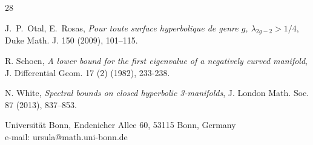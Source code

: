 \documentclass[11pt]{amsart}
\theoremstyle{plain}
\theoremstyle{plain}
\theoremstyle{definition}
\begin{document}
\begin{thebibliography}{28}







 J.~P.~Otal, E.~Rosas,
{\em Pour toute surface hyperbolique de genre $g$, 
$\lambda_{2g-2}>1/4$}, Duke Math. J. 150 (2009), 101--115. 





 R. Schoen,  {\em A lower bound for the first eigenvalue of a negatively curved manifold}, 
J. Differential Geom. 17 (2) (1982), 233-238.




 N. White, {\em Spectral bounds on closed hyperbolic 3-manifolds}, J. London Math. Soc. 87 (2013), 837--853.  











\end{thebibliography}

\bigskip

\noindent
Universit\"at Bonn, Endenicher Allee 60, 53115 Bonn, Germany\\
e-mail: ursula@math.uni-bonn.de
\end{document}
